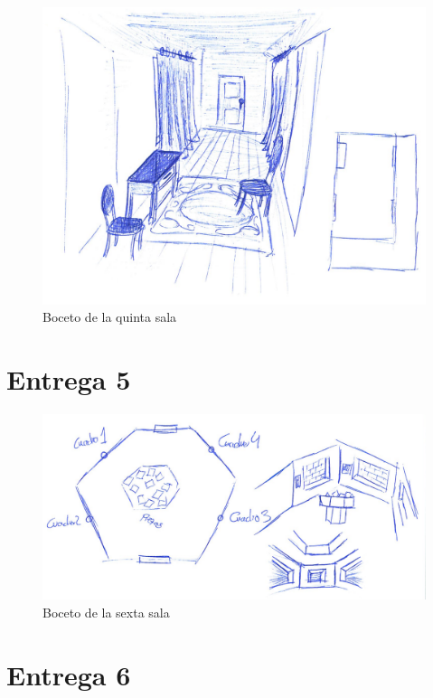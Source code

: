 \begin{figure}[!h]
\begin{center}
\includegraphics[width=1\textwidth]{imagenes/7/bocetos/boceto-sala-5.png}
\caption{Boceto de la quinta sala}
\label{fig:bocetos-salas-5}
\end{center}
\end{figure}

\section{Entrega 5}

\begin{figure}[!h]
\begin{center}
\includegraphics[width=1\textwidth]{imagenes/7/bocetos/boceto-sala-6.png}
\caption{Boceto de la sexta sala}
\label{fig:bocetos-salas-6}
\end{center}
\end{figure}

\section{Entrega 6}

